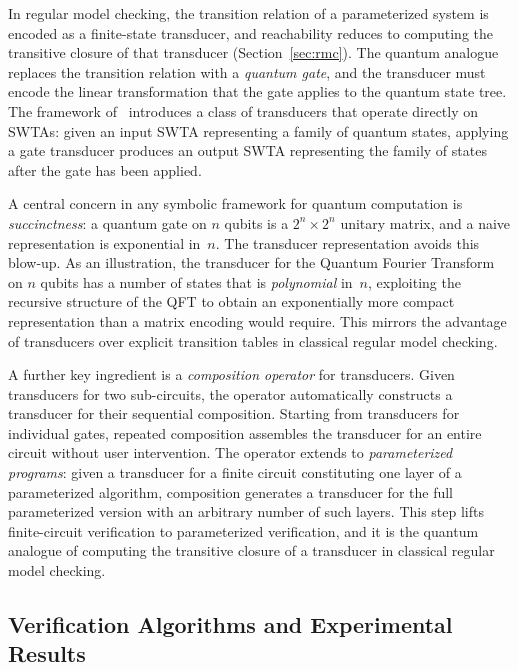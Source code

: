 In regular model checking, the transition relation of a parameterized system
is encoded as a finite-state transducer, and reachability reduces to computing
the transitive closure of that transducer (Section~\ref{sec:rmc}). The quantum
analogue replaces the transition relation with a \emph{quantum gate}, and the
transducer must encode the linear transformation that the gate applies to the
quantum state tree. The framework of~\cite{AutoQPara} introduces a class of
transducers that operate directly on SWTAs: given an input SWTA representing a
family of quantum states, applying a gate transducer produces an output SWTA
representing the family of states after the gate has been applied.

A central concern in any symbolic framework for quantum computation is
\emph{succinctness}: a quantum gate on $n$ qubits is a $2^n \times 2^n$
unitary matrix, and a naive representation is exponential in~$n$. The
transducer representation avoids this blow-up. As an illustration, the
transducer for the Quantum Fourier Transform on $n$ qubits has a number of
states that is \emph{polynomial} in~$n$, exploiting the recursive structure
of the QFT to obtain an exponentially more compact representation than a
matrix encoding would require. This mirrors the advantage of transducers
over explicit transition tables in classical regular model checking.

A further key ingredient is a \emph{composition operator} for transducers.
Given transducers for two sub-circuits, the operator automatically constructs
a transducer for their sequential composition. Starting from transducers for
individual gates, repeated composition assembles the transducer for an
entire circuit without user intervention. The operator extends to
\emph{parameterized programs}: given a transducer for a finite circuit
constituting one layer of a parameterized algorithm, composition generates
a transducer for the full parameterized version with an arbitrary number
of such layers. This step lifts finite-circuit verification to parameterized
verification, and it is the quantum analogue of computing the transitive
closure of a transducer in classical regular model checking.

\subsection{Verification Algorithms and Experimental Results}

